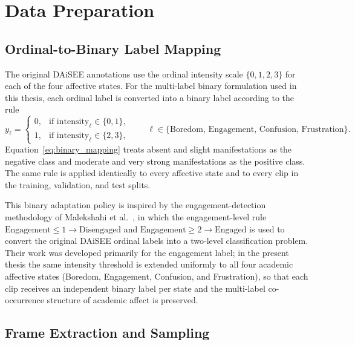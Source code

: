 \section{Data Preparation}\label{sec:method_preparation}

\subsection{Ordinal-to-Binary Label Mapping}\label{sec:method_binary_mapping}

The original \ac{DAiSEE} annotations use the ordinal intensity scale $\{0,1,2,3\}$ for each of the four affective states. For the multi-label binary formulation used in this thesis, each ordinal label is converted into a binary label according to the rule~\cite{malekshahi_engagement_2024}
\begin{equation}
y_{\ell} =
\begin{cases}
0, & \text{if intensity}_{\ell} \in \{0, 1\}, \\
1, & \text{if intensity}_{\ell} \in \{2, 3\},
\end{cases}
\qquad \ell \in \{\text{Boredom},\,\text{Engagement},\,\text{Confusion},\,\text{Frustration}\}.
\label{eq:binary_mapping}
\end{equation}
Equation~\eqref{eq:binary_mapping} treats absent and slight manifestations as the negative class and moderate and very strong manifestations as the positive class. The same rule is applied identically to every affective state and to every clip in the training, validation, and test splits.

This binary adaptation policy is inspired by the engagement-detection methodology of Malekshahi et al.~\cite{malekshahi_engagement_2024}, in which the engagement-level rule $\text{Engagement} \leq 1 \rightarrow \text{Disengaged}$ and $\text{Engagement} \geq 2 \rightarrow \text{Engaged}$ is used to convert the original \ac{DAiSEE} ordinal labels into a two-level classification problem. Their work was developed primarily for the engagement label; in the present thesis the same intensity threshold is extended uniformly to all four academic affective states (Boredom, Engagement, Confusion, and Frustration), so that each clip receives an independent binary label per state and the multi-label co-occurrence structure of academic affect is preserved.

\subsection{Frame Extraction and Sampling}\label{sec:method_frames}

